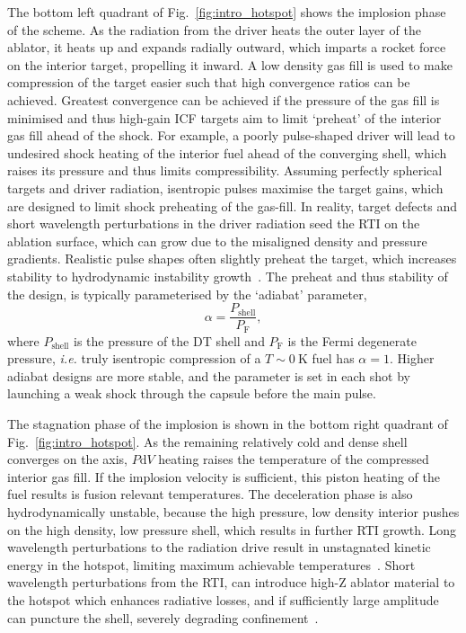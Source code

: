 The bottom left quadrant of Fig.~\ref{fig:intro_hotspot} shows the implosion phase of the scheme.
As the radiation from the driver heats the outer layer of the ablator, it heats up and expands radially outward, which imparts a rocket force on the interior target, propelling it inward.
A low density gas fill is used to make compression of the target easier such that high convergence ratios can be achieved.
Greatest convergence can be achieved if the pressure of the gas fill is minimised and thus high-gain \ac{ICF} targets aim to limit `preheat' of the interior gas fill ahead of the shock.
For example, a poorly pulse-shaped driver will lead to undesired shock heating of the interior fuel ahead of the converging shell, which raises its pressure and thus limits compressibility.
Assuming perfectly spherical targets and driver radiation, isentropic pulses maximise the target gains, which are designed to limit shock preheating of the gas-fill.
In reality, target defects and short wavelength perturbations in the driver radiation seed the \ac{RTI} on the ablation surface, which can grow due to the misaligned density and pressure gradients.
Realistic pulse shapes often slightly preheat the target, which increases stability to hydrodynamic instability growth~\cite{goncharov_improved_2003,hurricane_highfoot_2014}.
The preheat and thus stability of the design, is typically parameterised by the `adiabat' parameter,
\begin{equation}
    \label{eq:intro_adiabat}
    \alpha = \frac{P_{\text{shell}}}{P_{\text{F}}},
\end{equation}
where $P_{\text{shell}}$ is the pressure of the DT shell and $P_{\text{F}}$ is the Fermi degenerate pressure, \textit{i.e.} truly isentropic compression of a $T\sim0\ \text{K}$ fuel has $\alpha=1$.
Higher adiabat designs are more stable, and the parameter is set in each shot by launching a weak shock through the capsule before the main pulse.

The stagnation phase of the implosion is shown in the bottom right quadrant of Fig.~\ref{fig:intro_hotspot}.
As the remaining relatively cold and dense shell converges on the axis, $P\text{d}V$ heating raises the temperature of the compressed interior gas fill.
If the implosion velocity is sufficient, this piston heating of the fuel results is fusion relevant temperatures.
The deceleration phase is also hydrodynamically unstable, because the high pressure, low density interior pushes on the high density, low pressure shell, which results in further \ac{RTI} growth.
Long wavelength perturbations to the radiation drive result in unstagnated kinetic energy in the hotspot, limiting maximum achievable temperatures~\cite{gatujohnson_impact_2018}.
Short wavelength perturbations from the \ac{RTI}, can introduce high-Z ablator material to the hotspot which enhances radiative losses, and if sufficiently large amplitude can puncture the shell, severely degrading confinement~\cite{smalyuk_review_2020}.

